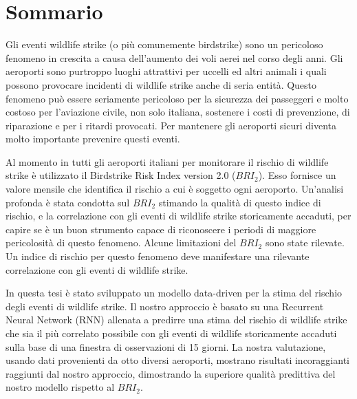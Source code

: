 \chapter*{Sommario}

Gli eventi wildlife strike (o più comunemente birdstrike) sono un pericoloso fenomeno in crescita a causa dell'aumento dei voli aerei nel corso degli anni. Gli aeroporti sono purtroppo luoghi attrattivi per uccelli ed altri animali i quali possono provocare incidenti di wildlife strike anche di seria entità.
Questo fenomeno può essere seriamente pericoloso per la sicurezza dei passeggeri e molto costoso per l'aviazione civile, non solo italiana, sostenere i costi di prevenzione, di riparazione e per i ritardi provocati.
Per mantenere gli aeroporti sicuri diventa molto importante prevenire questi eventi.

Al momento in tutti gli aeroporti italiani per monitorare il rischio di wildlife strike è utilizzato il Birdstrike Risk Index version 2.0 ($BRI_2$). Esso fornisce un valore mensile che identifica il rischio a cui è soggetto ogni aeroporto. 
Un'analisi profonda è stata condotta sul $BRI_2$ stimando la qualità di questo indice di rischio, e la correlazione con gli eventi di wildlife strike storicamente accaduti, per capire se è un buon strumento capace di riconoscere i periodi di maggiore pericolosità di questo fenomeno.
Alcune limitazioni del $BRI_2$ sono state rilevate. Un indice di rischio per questo fenomeno deve manifestare una rilevante correlazione con gli eventi di wildlife strike.

In questa tesi è stato sviluppato un modello data-driven per la stima del rischio degli eventi di wildlife strike. Il nostro approccio è basato su una Recurrent Neural Network (RNN) allenata a predirre una stima del rischio di wildlife strike che sia il più correlato possibile con gli eventi di wildlife storicamente accaduti sulla base di una finestra di osservazioni di 15 giorni.
La nostra valutazione, usando dati provenienti da otto diversi aeroporti, mostrano risultati incoraggianti raggiunti dal nostro approccio, dimostrando la superiore qualità predittiva del nostro modello rispetto al $BRI_2$.
